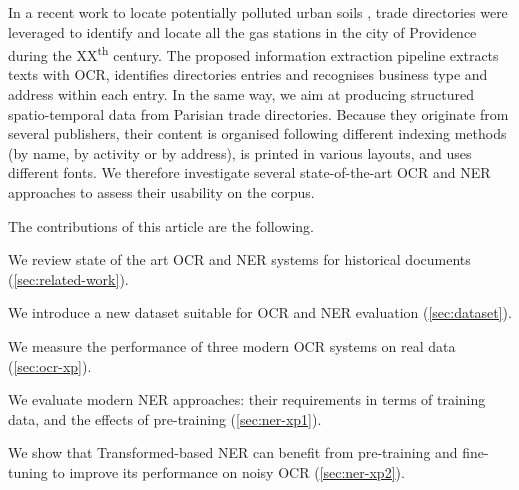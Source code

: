 In a recent work to locate potentially polluted urban soils \cite{bell2020automated}, trade directories were leveraged to identify and locate all the gas stations in the city of Providence during the XX\textsuperscript{th} century.
The proposed information extraction pipeline extracts texts with OCR, identifies directories entries and recognises business type and address within each entry.
In the same way, we aim at producing structured spatio-temporal data from Parisian trade directories.
Because they originate from several publishers, their content is organised following different indexing methods (by name, by activity or by address), is printed in various layouts, and uses different fonts.
We therefore investigate several state-of-the-art OCR and NER approaches to assess their usability on the corpus.

The contributions of this article are the following.
\begin{enumerate*}[(i)]
    \item We review state of the art OCR and NER systems for historical documents (\cref{sec:related-work}).
    \item We introduce a new dataset suitable for OCR and NER evaluation (\cref{sec:dataset}).
    \item We measure the performance of three modern OCR systems on real data (\cref{sec:ocr-xp}).
    \item We evaluate modern NER approaches: their requirements in terms of training data, and the effects of pre-training (\cref{sec:ner-xp1}).
    \item We show that Transformed-based NER can benefit from pre-training and fine-tuning to improve its performance on noisy OCR (\cref{sec:ner-xp2}).
\end{enumerate*}


